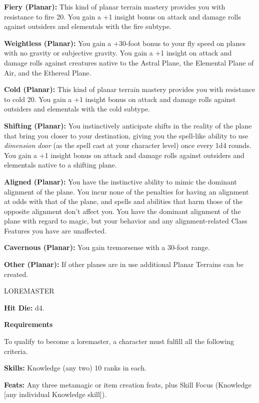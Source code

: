 \documentclass{article}
\begin{document}
\textbf{Fiery (Planar):} This kind of planar terrain mastery provides you with 
resistance to fire 20. You gain a +1 insight bonus on attack and damage rolls against 
outsiders and elementals with the fire subtype.

\textbf{Weightless (Planar):} You gain a +30-foot bonus to your fly speed on planes 
with no gravity or subjective gravity. You gain a +1 insight on attack and damage 
rolls against creatures native to the Astral Plane, the Elemental Plane of Air, 
and the Ethereal Plane.

\textbf{Cold (Planar):} This kind of planar terrain mastery provides you with resistance 
to cold 20. You gain a +1 insight bonus on attack and damage rolls against outsiders 
and elementals with the cold subtype.

\textbf{Shifting (Planar):} You instinctively anticipate shifts in the reality 
of the plane that bring you closer to your destination, giving you the spell-like 
ability to use \textit{dimension door }(as the spell cast at your character level) 
once every 1d4 rounds. You gain a +1 insight bonus on attack and damage rolls against 
outsiders and elementals native to a shifting plane.

\textbf{Aligned (Planar):} You have the instinctive ability to mimic the dominant 
alignment of the plane. You incur none of the penalties for having an alignment 
at odds with that of the plane, and spells and abilities that harm those of the 
opposite alignment don't affect you. You have the dominant alignment of the plane 
with regard to magic, but your behavior and any alignment-related Class Features 
you have are unaffected.

\textbf{Cavernous (Planar):} You gain tremorsense with a 30-foot range.

\textbf{Other (Planar):} If other planes are in use additional Planar Terrains 
can be created.

\vspace{12pt}
LOREMASTER

\textbf{Hit Die:} d4.

\textbf{Requirements}

To qualify to become a loremaster, a character must fulfill all the following criteria.

\textbf{Skills:} Knowledge (any two) 10 ranks in each.

\textbf{Feats:} Any three metamagic or item creation feats, plus Skill Focus (Knowledge 
[any individual Knowledge skill]).
\end{document}
